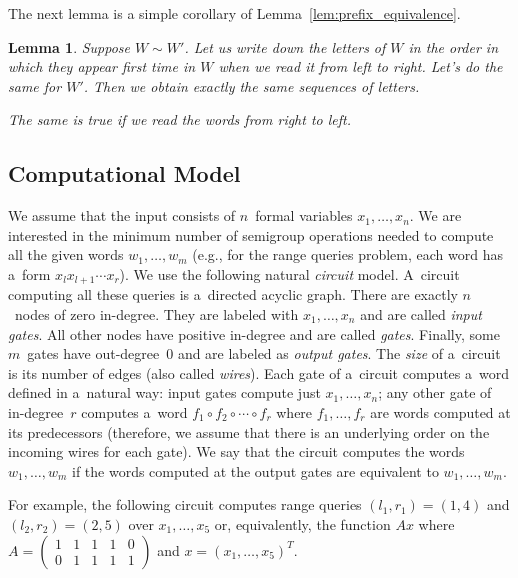 \documentclass[11pt,letterpaper]{article}
\newtheorem{lemma}{Lemma}
\begin{document}
The next lemma is a simple corollary of Lemma~\ref{lem:prefix_equivalence}.
\begin{lemma} \label{lem:variables_order}
Suppose $W \sim W'$. Let us write down the letters of $W$ in the order in which they appear first time in $W$ when we read it from left to right. Let's do the same for $W'$. Then we obtain exactly the same sequences of letters.

The same is true if we read the words from right to left.
\end{lemma}


\subsection{Computational Model}
We assume that the input consists of $n$~formal variables $x_1, \dotsc, x_n$. We are interested in the minimum number of semigroup operations needed to compute all the given words $w_1, \dotsc, w_m$ (e.g., for the range queries problem, each word has a~form $x_lx_{l+1}\dotsb x_r$). We use the following natural {\em circuit} model. A~circuit computing all these queries is a~directed acyclic graph. There are exactly $n$~nodes of zero in-degree. They are labeled with $x_1, \dotsc, x_n$ and are called {\em input gates}. All other nodes have positive in-degree and are called {\em gates}. Finally, some $m$~gates have out-degree~0 and are labeled as {\em output gates}. The {\em size} of a~circuit is its number of edges (also called {\em wires}). Each gate of a~circuit computes a~word defined in a~natural way: input gates compute just $x_1, \dotsc, x_n$; any other gate of in-degree~$r$ computes a~word $f_1 \circ f_2 \circ \dotsb \circ f_r$ where $f_1, \dotsc, f_r$ are words computed at its predecessors (therefore, we assume that there is an underlying order on the incoming wires for each gate). We say that the circuit computes the words $w_1, \dotsc, w_m$ if the words computed at the output gates are equivalent to $w_1, \dotsc, w_m$.

For example, the following circuit computes range queries $(l_1,r_1)=(1,4)$ and $(l_2,r_2)=(2,5)$ over $x_1, \dotsc, x_5$ or, equivalently, the function $Ax$ where $A=\begin{pmatrix}1&1&1&1&0\\0&1&1&1&1\end{pmatrix}$ and $x=(x_1, \dotsc, x_5)^T$.

\begin{center}
\end{center}
\end{document}
